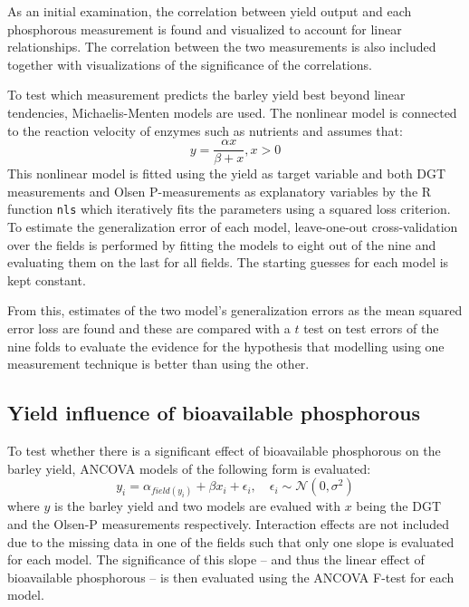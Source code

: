 \documentclass[11pt,fleqn]{article}
\begin{document}
As an initial examination, the correlation between yield output and each phosphorous measurement is found and visualized to account for linear relationships. The correlation between the two measurements is also included together with visualizations of the significance of the correlations.

To test which measurement predicts the barley yield best beyond linear tendencies, Michaelis-Menten models are used. The nonlinear model is connected to the reaction velocity of enzymes such as nutrients \cite{michment} and assumes that:
\[
y = \frac{\alpha x}{\beta + x}, x >0
\]
This nonlinear model is fitted using the yield as target variable and both DGT measurements and Olsen P-measurements as explanatory variables by the R function \texttt{nls} which iteratively fits the parameters using a squared loss criterion.  To estimate the generalization error of each model, leave-one-out cross-validation over the fields is performed by fitting the models to eight out of the nine and evaluating them on the last for all fields. The starting guesses for each model is kept constant.

From this, estimates of the two model's generalization errors as the mean squared error loss are found and these are compared with a $t$ test on test errors of the nine folds to evaluate the evidence for the hypothesis that modelling using one measurement technique is better than using the other.
\subsection{Yield influence of bioavailable phosphorous}
To test whether there is a significant effect of bioavailable phosphorous on the barley yield, ANCOVA models of the following form is evaluated:
\[
y_i = \alpha_{field(y_i)} + \beta x_i + \epsilon_i, \quad \epsilon_i \sim \mathcal N (0, \sigma^2)
\]
where \(y\) is the barley yield and two models are evalued with \(x\) being the DGT and the Olsen-P measurements respectively. Interaction effects are not included due to the missing data in one of the fields such that only one slope is evaluated for each model. The significance of this slope -- and thus the linear effect of bioavailable phosphorous -- is then evaluated using the ANCOVA F-test for each model.
\end{document}
